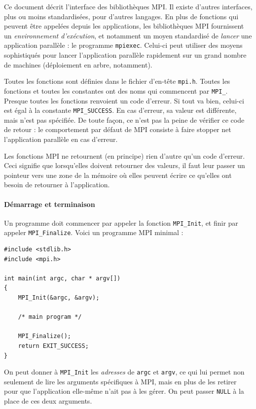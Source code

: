 Ce document décrit l'interface  des bibliothèques MPI. Il existe
d'autres interfaces, plus ou moins standardisées, pour d'autres langages. En
plus de fonctions qui peuvent être appelées depuis les applications, les
bibliothèques MPI fournissent un \emph{environnement d'exécution}, et notamment
un moyen standardisé de \emph{lancer} une application parallèle : le programme
\texttt{mpiexec}. Celui-ci peut utiliser des moyens sophistiqués pour lancer
l'application parallèle rapidement sur un grand nombre de machines (déploiement
en arbre, notamment).

Toutes les fonctions sont définies dans le fichier d'en-tête
\texttt{mpi.h}. Toutes les fonctions et toutes les constantes ont des noms qui
commencent par \texttt{MPI\_}. Presque toutes les fonctions renvoient un code
d'erreur. Si tout va bien, celui-ci est égal à la constante
\texttt{MPI\_SUCCESS}. En cas d'erreur, sa valeur est différente, mais n'est pas
spécifiée. De toute façon, ce n'est pas la peine de vérifier ce code de retour :
le comportement par défaut de MPI consiste à faire stopper net l'application
parallèle en cas d'erreur.

Les fonctions MPI ne retournent (en principe) rien d'autre qu'un code
d'erreur. Ceci signifie que lorsqu'elles doivent retourner des valeurs, il faut
leur passer un pointeur vers une zone de la mémoire où elles peuvent écrire ce
qu'elles ont besoin de retourner à l'application.

\paragraph{Démarrage et terminaison} Un programme doit commencer par
appeler la fonction \texttt{MPI\_Init}, et finir par appeler
\texttt{MPI\_Finalize}. Voici un programme MPI minimal :

\begin{verbatim}
#include <stdlib.h>
#include <mpi.h>

int main(int argc, char * argv[])
{
    MPI_Init(&argc, &argv);

    /* main program */

    MPI_Finalize();
    return EXIT_SUCCESS;
}
\end{verbatim}

On peut donner à \texttt{MPI\_Init} les \emph{adresses} de \texttt{argc} et
\texttt{argv}, ce qui lui permet non seulement de lire les arguments spécifiques
à MPI, mais en plus de les retirer pour que l'application elle-même n'ait pas à
les gérer. On peut passer \texttt{NULL} à la place de ces deux arguments.


